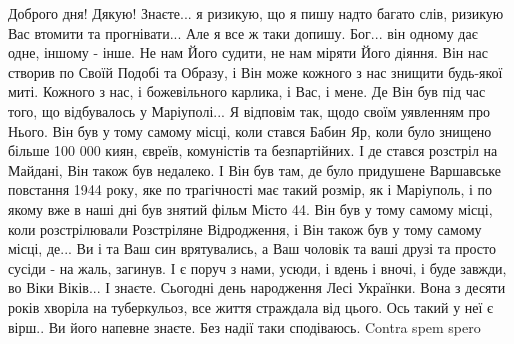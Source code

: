 




Доброго дня! Дякую! Знаєте... я ризикую, що я пишу надто багато слів, ризикую
Вас втомити та прогнівати... Але я все ж таки допишу. Бог... він одному дає
одне, іншому - інше. Не нам Його судити, не нам міряти Його діяння. Він нас
створив по Своїй Подобі та Образу, і Він може кожного з нас знищити будь-якої
миті. Кожного з нас, і божевільного карлика, і Вас, і мене. Де Він був під час
того, що відбувалось у Маріуполі... Я відповім так, щодо своїм уявленням про
Нього. Він був у тому самому місці, коли стався Бабин Яр, коли було знищено
більше 100 000 киян, євреїв, комуністів та безпартійних. І де стався розстріл
на Майдані, Він також був недалеко. І Він був там, де було придушене Варшавське
повстання 1944 року, яке по трагічності має такий розмір, як і Маріуполь, і по
якому вже в наші дні був знятий фільм Місто 44. Він був у тому самому місці,
коли розстрілювали Розстріляне Відродження, і Він також був у тому самому
місці, де... Ви і та Ваш син врятувались, а Ваш чоловік та ваші друзі та просто
сусіди - на жаль, загинув. І є поруч з нами, усюди, і вдень і вночі, і буде
завжди, во Віки Віків... І знаєте. Сьогодні день народження Лесі Українки. Вона
з десяти років хворіла на туберкульоз, все життя страждала від цього.  Ось
такий у неї є вірш.. Ви його напевне знаєте. Без надії таки сподіваюсь. Contra
spem spero

